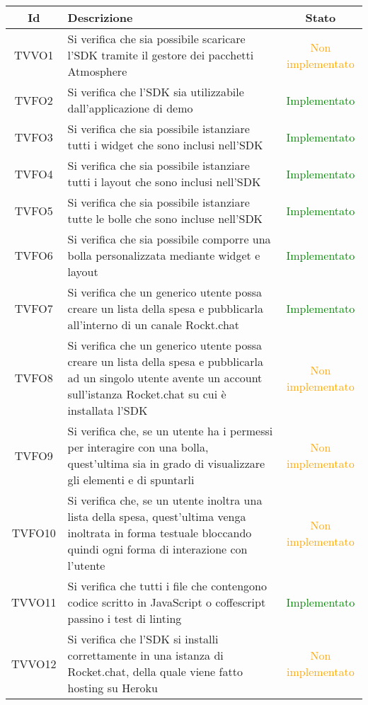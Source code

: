\begin{center}
	\begin{longtable}{|c|>{\centering}m{10cm}|c|}\hline
		Id & Descrizione & Stato\\ \hline
		TVVO1 & Si verifica che sia possibile scaricare l'SDK tramite il gestore dei pacchetti Atmosphere & \textcolor{Orange}{Non implementato}\\ \hline
		TVFO2 & Si verifica che l'SDK sia utilizzabile dall'applicazione di demo & \textcolor{Green}{Implementato}\\ \hline
		TVFO3 & Si verifica che sia possibile istanziare tutti i widget che sono inclusi nell'SDK & \textcolor{Green}{Implementato}\\ \hline
		TVFO4 & Si verifica che sia possibile istanziare tutti i layout che sono inclusi nell'SDK & \textcolor{Green}{Implementato}\\ \hline
		TVFO5 & Si verifica che sia possibile istanziare tutte le bolle che sono incluse nell'SDK & \textcolor{Green}{Implementato}\\ \hline
		TVFO6 & Si verifica che sia possibile comporre una bolla personalizzata mediante widget e layout & \textcolor{Green}{Implementato}\\ \hline
		TVFO7 & Si verifica che un generico utente possa creare un lista della spesa e pubblicarla all'interno di un canale Rockt.chat & \textcolor{Green}{Implementato}\\ \hline
		TVFO8 & Si verifica che un generico utente possa creare un lista della spesa e pubblicarla ad un singolo utente avente un account sull'istanza Rocket.chat su cui è installata l'SDK & \textcolor{Orange}{Non implementato}\\ \hline
		TVFO9 & Si verifica che, se un utente ha i permessi per interagire con una bolla, quest'ultima sia in grado di visualizzare gli elementi e di spuntarli & \textcolor{Orange}{Non implementato}\\ \hline
		TVFO10 & Si verifica che, se un utente inoltra una lista della spesa, quest'ultima venga inoltrata in forma testuale bloccando quindi ogni forma di interazione con l'utente & \textcolor{Orange}{Non implementato}\\ \hline
		TVVO11 & Si verifica che tutti i file che contengono codice scritto in JavaScript o coffescript passino i test di linting & \textcolor{Green}{Implementato}\\ \hline
		TVVO12 & Si verifica che l'SDK si installi correttamente in una istanza di Rocket.chat, della quale viene fatto hosting su Heroku & \textcolor{Orange}{Non implementato}\\ \hline

\end{longtable}
\end{center}
